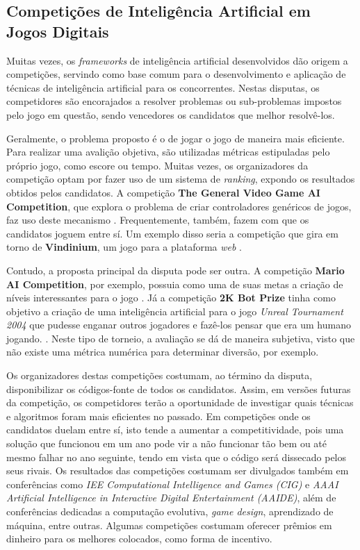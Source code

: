 \subsection{Competições de Inteligência Artificial em Jogos Digitais}
Muitas vezes, os \textit{frameworks} de inteligência artificial desenvolvidos
dão origem a competições, servindo como base comum para o desenvolvimento e
aplicação de técnicas de inteligência artificial para os concorrentes. Nestas
disputas, os competidores são encorajados a resolver problemas ou sub-problemas
impostos pelo jogo em questão, sendo vencedores os candidatos que melhor
resolvê-los.

Geralmente, o problema proposto é o de jogar o jogo de maneira mais eficiente.
Para realizar uma avalição objetiva, são utilizadas métricas estipuladas pelo
próprio jogo, como escore ou tempo. Muitas vezes, os organizadores da
competição optam por fazer uso de um sistema de \textit{ranking}, expondo os
resultados obtidos pelos candidatos. A competição \textbf{The General Video
Game AI Competition}, que explora o problema de criar controladores genéricos
de jogos, faz uso deste mecanismo \cite{GVGAIWEB}.  Frequentemente, também,
fazem com que os candidatos joguem entre sí.  Um exemplo disso seria a
competição que gira em torno de \textbf{Vindinium}, um jogo para a plataforma
\textit{web} \cite{VINDINIUMWEB}.

Contudo, a proposta principal da disputa pode ser outra. A competição
\textbf{Mario AI Competition}, por exemplo, possuia como uma de suas metas a
criação de níveis interessantes para o jogo \cite{MARIOAIWEB}. Já a competição
\textbf{2K Bot Prize} tinha como objetivo a criação de uma inteligência
artificial para o jogo \textit{Unreal Tournament 2004} que pudesse enganar
outros jogadores e fazê-los pensar que era um humano jogando.
\cite{UNREALAIWEB}. Neste tipo de torneio, a avaliação se dá de maneira
subjetiva, visto que não existe uma métrica numérica para determinar diversão,
por exemplo.

Os organizadores destas competições costumam, ao término da disputa,
disponibilizar os códigos-fonte de todos os candidatos. Assim, em versões
futuras da competição, os competidores terão a oportunidade de investigar quais
técnicas e algoritmos foram mais eficientes no passado. Em competições onde os
candidatos duelam entre sí, isto tende a aumentar a competitividade, pois uma
solução que funcionou em um ano pode vir a não funcionar tão bem ou até mesmo
falhar no ano seguinte, tendo em vista que o código será dissecado pelos seus
rivais. Os resultados das competições costumam ser divulgados também em
conferências como \textit{IEE Computational Intelligence and Games (CIG)} e
\textit{AAAI Artificial Intelligence in Interactive Digital Entertainment
(AAIDE)}, além de conferências dedicadas a computação evolutiva, \textit{game
design}, aprendizado de máquina, entre outras. Algumas competições costumam
oferecer prêmios em dinheiro para os melhores colocados, como forma de
incentivo.



